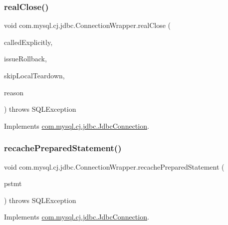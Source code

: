 \subsubsection{\texorpdfstring{real\+Close()}{realClose()}}
{\footnotesize\ttfamily void com.\+mysql.\+cj.\+jdbc.\+Connection\+Wrapper.\+real\+Close (\begin{DoxyParamCaption}\item[{boolean}]{called\+Explicitly,  }\item[{boolean}]{issue\+Rollback,  }\item[{boolean}]{skip\+Local\+Teardown,  }\item[{Throwable}]{reason }\end{DoxyParamCaption}) throws S\+Q\+L\+Exception}



Implements \mbox{\hyperlink{interfacecom_1_1mysql_1_1cj_1_1jdbc_1_1_jdbc_connection_af5f24cb10cfc14e0174c6bb115745bc0}{com.\+mysql.\+cj.\+jdbc.\+Jdbc\+Connection}}.

\mbox{\label{classcom_1_1mysql_1_1cj_1_1jdbc_1_1_connection_wrapper_ae7dff9b2bff1a886f31494f3f5985d12}} 
\subsubsection{\texorpdfstring{recache\+Prepared\+Statement()}{recachePreparedStatement()}}
{\footnotesize\ttfamily void com.\+mysql.\+cj.\+jdbc.\+Connection\+Wrapper.\+recache\+Prepared\+Statement (\begin{DoxyParamCaption}\item[{\mbox{\hyperlink{interfacecom_1_1mysql_1_1cj_1_1jdbc_1_1_jdbc_prepared_statement}{Jdbc\+Prepared\+Statement}}}]{pstmt }\end{DoxyParamCaption}) throws S\+Q\+L\+Exception}



Implements \mbox{\hyperlink{interfacecom_1_1mysql_1_1cj_1_1jdbc_1_1_jdbc_connection_a24f00ff038a4f01aab9dea9e2817c084}{com.\+mysql.\+cj.\+jdbc.\+Jdbc\+Connection}}.

\mbox{\label{classcom_1_1mysql_1_1cj_1_1jdbc_1_1_connection_wrapper_a159040767ba2d7f2656548188ed6e29a}} 
